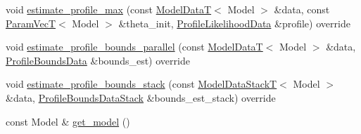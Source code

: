 \begin{DoxyCompactItemize}
\item 
void \hyperlink{classmappel_1_1estimator_1_1ThreadedEstimator_a16ce4964abd0e18da2f9ec7e8bd5b4ee}{estimate\+\_\+profile\+\_\+max} (const \hyperlink{namespacemappel_a97f050df953605381ae9c901c3b125f1}{Model\+DataT}$<$ Model $>$ \&data, const \hyperlink{namespacemappel_a0f86d3153e4e27b095012f140eea58de}{Param\+VecT}$<$ Model $>$ \&theta\+\_\+init, \hyperlink{namespacemappel_1_1estimator_structmappel_1_1estimator_1_1ProfileLikelihoodData}{Profile\+Likelihood\+Data} \&profile) override
\item 
void \hyperlink{classmappel_1_1estimator_1_1ThreadedEstimator_a518454a427336c48a83d145b917ec3f7}{estimate\+\_\+profile\+\_\+bounds\+\_\+parallel} (const \hyperlink{namespacemappel_a97f050df953605381ae9c901c3b125f1}{Model\+DataT}$<$ Model $>$ \&data, \hyperlink{structmappel_1_1estimator_1_1ProfileBoundsData}{Profile\+Bounds\+Data} \&bounds\+\_\+est) override
\item 
void \hyperlink{classmappel_1_1estimator_1_1ThreadedEstimator_a3701a1dcbe15b6b8c35c15c929d7429a}{estimate\+\_\+profile\+\_\+bounds\+\_\+stack} (const \hyperlink{namespacemappel_aaeb6665bc57476dd93c2df6ad8bc4768}{Model\+Data\+StackT}$<$ Model $>$ \&data, \hyperlink{structmappel_1_1estimator_1_1ProfileBoundsDataStack}{Profile\+Bounds\+Data\+Stack} \&bounds\+\_\+est\+\_\+stack) override
\item 
const Model \& \hyperlink{classmappel_1_1estimator_1_1Estimator_a076f485dfe0a925e01520c173f6fffe4}{get\+\_\+model} ()
\end{DoxyCompactItemize}
{\bf }\par
